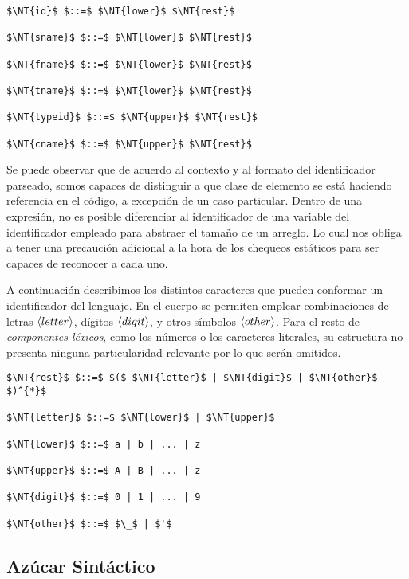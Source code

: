 \begin{lstlisting}[style = syntax]
$\NT{id}$ $::=$ $\NT{lower}$ $\NT{rest}$

$\NT{sname}$ $::=$ $\NT{lower}$ $\NT{rest}$

$\NT{fname}$ $::=$ $\NT{lower}$ $\NT{rest}$

$\NT{tname}$ $::=$ $\NT{lower}$ $\NT{rest}$

$\NT{typeid}$ $::=$ $\NT{upper}$ $\NT{rest}$

$\NT{cname}$ $::=$ $\NT{upper}$ $\NT{rest}$
\end{lstlisting}

Se puede observar que de acuerdo al contexto y al formato del identificador parseado, somos capaces de distinguir a que clase de elemento se está haciendo referencia en el código, a excepción de un caso particular.
Dentro de una expresión, no es posible diferenciar al identificador de una variable del identificador empleado para abstraer el tamaño de un arreglo.
Lo cual nos obliga a tener una precaución adicional a la hora de los chequeos estáticos para ser capaces de reconocer a cada uno.

A continuación describimos los distintos caracteres que pueden conformar un identificador del lenguaje.
En el cuerpo se permiten emplear combinaciones de letras $\langle letter \rangle$, dígitos $\langle digit \rangle$, y otros símbolos $\langle other \rangle$. 
Para el resto de \textit{componentes léxicos}, como los números o los caracteres literales, su estructura no presenta ninguna particularidad relevante por lo que serán omitidos.

\begin{lstlisting}[style = syntax]
$\NT{rest}$ $::=$ $($ $\NT{letter}$ | $\NT{digit}$ | $\NT{other}$ $)^{*}$

$\NT{letter}$ $::=$ $\NT{lower}$ | $\NT{upper}$

$\NT{lower}$ $::=$ a | b | ... | z

$\NT{upper}$ $::=$ A | B | ... | z

$\NT{digit}$ $::=$ 0 | 1 | ... | 9

$\NT{other}$ $::=$ $\_$ | $'$
\end{lstlisting}

\subsection{Azúcar Sintáctico}

